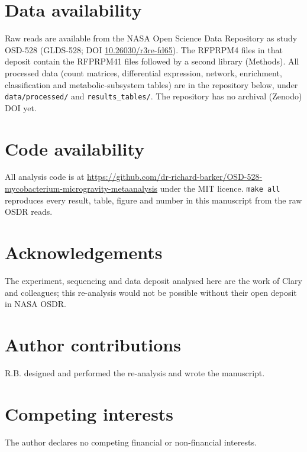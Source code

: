 \section*{Data availability}
Raw reads are available from the NASA Open Science Data Repository as study OSD-528 (GLDS-528; DOI \href{https://doi.org/10.26030/r3re-fd65}{10.26030/r3re-fd65}). The RFPRPM4 files in that deposit contain the RFPRPM41 files followed by a second library (Methods). All processed data (count matrices, differential expression, network, enrichment, classification and metabolic-subsystem tables) are in the repository below, under \texttt{data/processed/} and \texttt{results\_tables/}. The repository has no archival (Zenodo) DOI yet.

\section*{Code availability}
All analysis code is at \url{https://github.com/dr-richard-barker/OSD-528-mycobacterium-microgravity-metaanalysis} under the MIT licence. \texttt{make all} reproduces every result, table, figure and number in this manuscript from the raw OSDR reads.

\section*{Acknowledgements}
The experiment, sequencing and data deposit analysed here are the work of Clary and colleagues\cite{clary2022development}; this re-analysis would not be possible without their open deposit in NASA OSDR.

\section*{Author contributions}
R.B. designed and performed the re-analysis and wrote the manuscript.

\section*{Competing interests}
The author declares no competing financial or non-financial interests.
